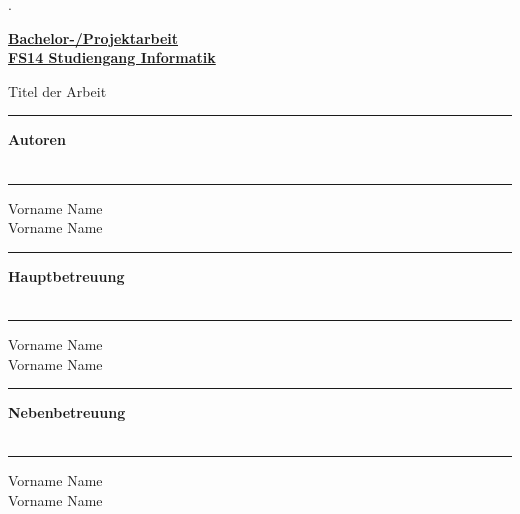 \begin{titlepage}


\begin{minipage}[b]{0.117\textwidth}
\hskip 0.05cm
\end{minipage}
\begin{minipage}[b]{0.91\textwidth}
\begin{tiny}.\end{tiny}\vskip 2.8cm
	{\huge
	
	\textbf{\underline{Bachelor-/Projektarbeit}}\\
	\textbf{\underline{FS14 Studiengang Informatik}}
	
	Titel der Arbeit
	\vskip 0.5cm}
	
	\begin{minipage}[b]{0.27\textwidth}
	\hrule\vskip 0.5cm
		\textbf{Autoren}\\
		\\
	\end{minipage}
	\begin{minipage}[b]{0.03\textwidth}
	\hskip 0.5cm
	\end{minipage}
	\begin{minipage}[b]{0.7\textwidth}
	\hrule\vskip 0.5cm
		Vorname Name\\
		Vorname Name\\
	\end{minipage}
	
	\begin{minipage}[b]{0.27\textwidth}
	\hrule\vskip 0.5cm
		\textbf{Hauptbetreuung}\\
		\\
	\end{minipage}
	\begin{minipage}[b]{0.03\textwidth}
	\hskip 0.5cm
	\end{minipage}
	\begin{minipage}[b]{0.7\textwidth}
	\hrule\vskip 0.5cm
		Vorname Name\\
		Vorname Name\\
	\end{minipage}
	
	\begin{minipage}[b]{0.27\textwidth}
	\hrule\vskip 0.5cm
		\textbf{Nebenbetreuung}\\
		\\
	\end{minipage}
	\begin{minipage}[b]{0.03\textwidth}
	\hskip 0.5cm
	\end{minipage}
	\begin{minipage}[b]{0.7\textwidth}
	\hrule\vskip 0.5cm
		Vorname Name\\
		Vorname Name\\
	\end{minipage}
	

\end{minipage}
\end{titlepage}
